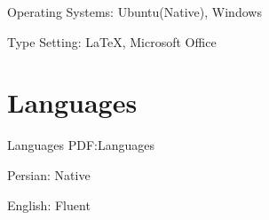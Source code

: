 \documentclass[a4paper,9pt,oneside]{article}
\begin{document}
\begin{body}
\BulletItem
Operating Systems:
Ubuntu(Native),
Windows

\BulletItem
Type Setting:
{\LaTeX},
Microsoft Office



\section
{Languages}
{Languages}
{PDF:Languages}

\BulletItem
Persian: Native

\GapNoBreak
\BulletItem
English: Fluent



\end{body}

\end{document}
